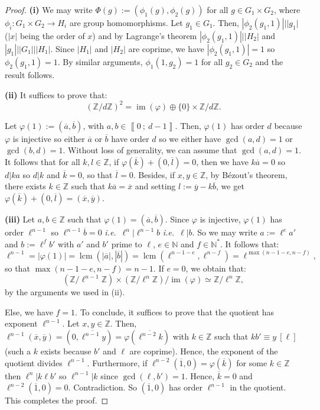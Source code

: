 \documentclass[a4paper,10pt,notitlepage]{report}
\theoremstyle{definition}
\theoremstyle{plain}
\theoremstyle{definition}
\newcommand{\ie}{\emph{i.e.}\ }
\newcommand{\N}{\mathbb{N}}
\newcommand{\Z}{\mathbb{Z}}
\DeclareMathOperator{\im}{im}
\renewcommand{\i}[2]{\left\llbracket #1~;~#2\right\rrbracket}
\renewcommand{\(}{\left(}
\renewcommand{\)}{\right)}
\DeclareMathOperator{\lcm}{lcm}
\begin{document}
\begin{proof}
\textbf{(i)} We may write $\Phi(g):=(\phi_1(g),\phi_2(g))$ for all $g\in G_1\times G_2$, where $\phi_i:G_1\times G_2\longrightarrow H_i$ are group homomorphisms.  Let $g_1\in G_1$. Then, $|\phi_2(g_1,1)|||g_1|$ ($|x|$ being the order of $x$) and by Lagrange's theorem $|\phi_2(g_1,1)|||H_2|$ and $|g_1|||G_1|||H_1|$. Since $|H_1|$ and $|H_2|$ are coprime, we have $|\phi_2(g_1,1)|=1$ so $\phi_2(g_1,1)=1$. By similar arguments, $\phi_1(1,g_2)=1$ for all $g_2\in G_2$ and the result follows.

\textbf{(ii)} It suffices to prove that:
\[ (\Z/d\Z)^2=\im(\varphi)\oplus\{0\}\times\Z/d\Z.\]

Let $\varphi(1):=(\overline{a},\overline{b})$, with $a,b\in\i{0}{d-1}$. Then,  $\varphi(1)$ has order $d$ because $\varphi$ is injective so either $\overline{a}$ or $\overline{b}$ have order $d$ so we either have $\gcd(a,d)=1$ or $\gcd(b,d)=1$. Without loss of generality, we can assume that $\gcd(a,d)=1$.  It follows that for all $k,l\in\Z$, if $\varphi(\overline{k})+(0,\overline{l})=0$, then we have $k\overline{a}=0$ so $d|ka$ so $d|k$ and $\overline{k}=0$, so that $\overline{l}=0$. Besides, if $x,y\in\Z$, by B\'{e}zout's theorem, there exists $k\in\Z$ such that $k\overline{a}=\overline{x}$ and setting $l:=\overline{y}-k\overline{b}$, we get $\varphi(\overline{k})+(0,\overline{l})=(\overline{x},\overline{y})$. 

\textbf{(iii)} Let $a,b\in\Z$ such that $\varphi(1)=(\overline{a},\overline{b})$.  Since $\varphi$ is injective, $\varphi(1)$ has order $\ell^{n-1}$ so $\ell^{n-1}\overline{b}=0$ \ie $\ell^n|\ell^{n-1}b$ \ie $\ell|b$. So we may write $a:=\ell^e a'$ and $b:=\ell^f b'$ with $a'$ and $b'$ prime to $\ell$, $e\in\N$ and $f\in\N^*$.  It follows that:
\[\ell^{n-1}=|\varphi(1)|=\lcm(|\overline{a}|,|\overline{b}|)=\lcm(\ell^{n-1-e},\ell^{n-f})=\ell^{\max(n-1-e,n-f)},\]
so that $\max(n-1-e,n-f)=n-1$. If $e=0$, we obtain that:
\[(\Z/\ell^{n-1}\Z)\times(\Z/\ell^{n}\Z)/\im(\varphi)\simeq \Z/\ell^{n}\Z,\]
by the arguments we used in (ii). 

Else, we have $f=1$. To conclude, it suffices to prove that the quotient has exponent $\ell^{n-1}$. Let $x,y\in\Z$. Then, $\ell^{n-1}(\overline{x},\overline{y})=(0,\overline{\ell^{n-1}y})=\varphi(\overline{\ell^{n-2}k})$ with $k\in\Z$ such that $kb'\equiv y \ [\ell]$ (such a $k$ exists because $b'$ and $\ell$ are coprime).  Hence, the exponent of the quotient divides $\ell^{n-1}$.  Furthermore, if $\ell^{n-2}(\overline{1},0)=\varphi(\overline{k})$ for some $k\in\Z$ then $\ell^n|k\ell b'$ so $\ell^{n-1}|k$ since $\gcd(\ell,b')=1$. Hence, $\overline{k}=0$ and $\ell^{n-2}(\overline{1},0)=0$. Contradiction. So $(\overline{1},0)$ has order $\ell^{n-1}$ in the quotient. This completes the proof.

\end{proof}
\end{document}
